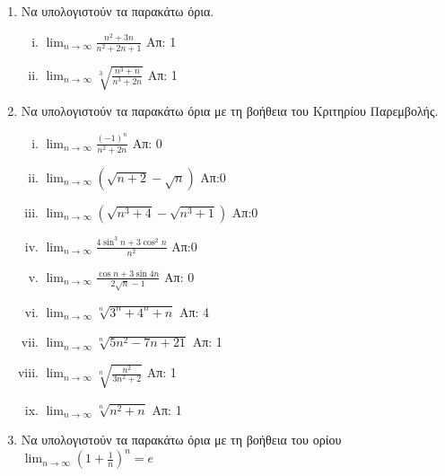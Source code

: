 \begin{enumerate}

    \item Να υπολογιστούν τα παρακάτω όρια.
        \begin{enumerate}[i)]
            \item $ \lim_{n \to \infty} \frac{n^{2}+3n}{n^{2}+2n+1} $ \hfill Απ: 1 
            \item $ \lim_{n \to \infty} \sqrt[3]{\frac{n^{3}+n}{n^{3}+2n}} $ 
                \hfill Απ: 1 
        \end{enumerate}

    \item Να υπολογιστούν τα παρακάτω όρια με τη βοήθεια του Κριτηρίου 
        Παρεμβολής.

        \begin{enumerate}[i)]
            \item $ \lim_{n \to \infty} \frac{(-1)^{n}}{n^{2}+2n}  $ \hfill Απ: 0  
            \item $ \lim_{n \to \infty} (\sqrt{n+2} - \sqrt{n})  $ \hfill Απ:0
            \item $ \lim_{n \to \infty} (\sqrt{n^{3}+4} - \sqrt{n^{3}+1})  $ \hfill Απ:0
            \item $ \lim_{n \to \infty} \frac{4 \sin^{3}{n} + 3 \cos^{2}{n}}{n^{2}} $ 
                \hfill Απ:0
            \item $ \lim_{n \to \infty} \frac{\cos{n} + 3 \sin{4n}}{ 2
                \sqrt{n} -1} $ \hfill Απ: 0  
            \item $ \lim_{n \to \infty} \sqrt[n]{3^{n}+4^{n}+n} $ \hfill Απ: 4 
            \item $ \lim_{n \to \infty} \sqrt[n]{5n^{2}-7n+21} $ \hfill Απ: 1  
            \item $ \lim_{n \to \infty} \sqrt[n]{\frac{n^{2}}{3n^{2}+2}} $ \hfill Απ: 1 
            \item $ \lim_{n \to \infty} \sqrt[n]{n^{2}+n} $ \hfill Απ: 1 
        \end{enumerate}

    \item Να υπολογιστούν τα παρακάτω όρια με τη βοήθεια του ορίου 
        $ \lim_{n \to \infty} \left(1+ \frac{1}{n}\right)^{n}=e $


\end{enumerate}
